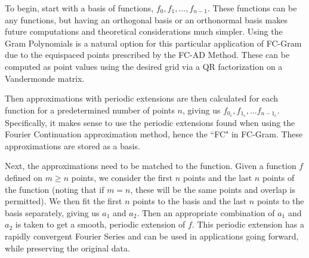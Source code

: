 \documentclass[11pt]{amsart}
\begin{document}
To begin, start with a basis of functions, $f_0,f_1,\ldots,f_{n-1}$.  These functions can be any functions, but having an orthogonal basis or an orthonormal basis makes future computations  and theoretical considerations much simpler.  Using the Gram Polynomials is a natural option for this particular application of FC-Gram due to the equispaced points prescribed by the FC-AD Method.   These can be computed as point values using the desired grid via a QR factorization on a Vandermonde matrix.  
 
Then approximations with periodic extensions are then calculated for each function for a predetermined number of points $n$, giving us $f_{0_c},f_{1_c},\ldots f_{n-1_c}$.  Specifically, it makes sense to use the periodic extensions found when using the Fourier Continuation approximation method, hence the ``FC" in FC-Gram.  These approximations are stored as a basis.  

Next, the approximations need to be matched to the function.  Given a function $f$ defined on $m \geq n$ points, we consider the first $n$ points and the last $n$ points of the function (noting that if $m=n$, these will be the same points and overlap is permitted). We then fit the first $n$ points to the basis and the last $n$ points to the basis separately, giving us $a_1$ and $a_2$.  Then an appropriate combination of $a_1$ and $a_2$ is taken to get a smooth, periodic extension of $f$.  This periodic extension has a rapidly convergent Fourier Series and can be used in applications going forward, while preserving the original data.   
\end{document}
